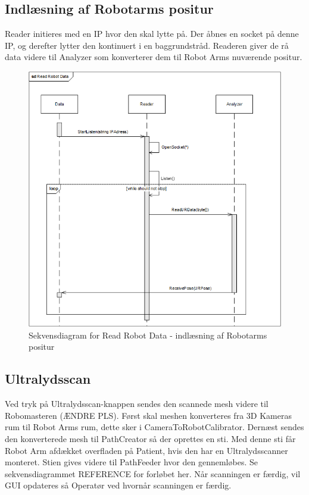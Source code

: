 \subsection{Indlæsning af Robotarms positur} 
Reader initieres med en IP hvor den skal lytte på. 
Der åbnes en socket på denne IP, og derefter lytter den kontinuert i en baggrundstråd. 
Readeren giver de rå data videre til Analyzer som konverterer dem til Robot Arms nuværende positur.

\begin{figure}[H]
    \centering
    \includegraphics[width=1\textwidth]{figurer/d/Design/Sequence/sd_reading}
    \caption{Sekvensdiagram for Read Robot Data - indlæsning af Robotarms positur}
    \label{sd_reading}
\end{figure}

\subsection{Ultralydsscan}
Ved tryk på Ultralydsscan-knappen sendes den scannede mesh videre til Robomasteren (ÆNDRE PLS).
Først skal meshen konverteres fra 3D Kameras rum til Robot Arms rum, dette sker i CameraToRobotCalibrator.
Dernæst sendes den konverterede mesh til PathCreator så der oprettes en sti. 
Med denne sti får Robot Arm afdækket overfladen på Patient, hvis den har en Ultralydsscanner monteret.
Stien gives videre til PathFeeder hvor den gennemløbes. Se sekvensdiagrammet REFERENCE for forløbet her.
Når scanningen er færdig, vil GUI opdateres så Operatør ved hvornår scanningen er færdig.

